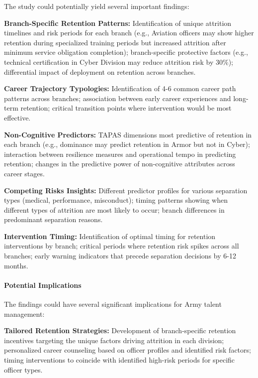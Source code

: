 \documentclass[../main.tex]{subfiles}
\begin{document}
The study could potentially yield several important findings:

\textbf{Branch-Specific Retention Patterns:} Identification of unique attrition timelines and risk periods for each branch (e.g., Aviation officers may show higher retention during specialized training periods but increased attrition after minimum service obligation completion); branch-specific protective factors (e.g., technical certification in Cyber Division may reduce attrition risk by 30\%); differential impact of deployment on retention across branches.

\textbf{Career Trajectory Typologies:} Identification of 4-6 common career path patterns across branches; association between early career experiences and long-term retention; critical transition points where intervention would be most effective.

\textbf{Non-Cognitive Predictors:} TAPAS dimensions most predictive of retention in each branch (e.g., dominance may predict retention in Armor but not in Cyber); interaction between resilience measures and operational tempo in predicting retention; changes in the predictive power of non-cognitive attributes across career stages.

\textbf{Competing Risks Insights:} Different predictor profiles for various separation types (medical, performance, misconduct); timing patterns showing when different types of attrition are most likely to occur; branch differences in predominant separation reasons.

\textbf{Intervention Timing:} Identification of optimal timing for retention interventions by branch; critical periods where retention risk spikes across all branches; early warning indicators that precede separation decisions by 6-12 months.

\paragraph{Potential Implications}

The findings could have several significant implications for Army talent management:

\textbf{Tailored Retention Strategies:} Development of branch-specific retention incentives targeting the unique factors driving attrition in each division; personalized career counseling based on officer profiles and identified risk factors; timing interventions to coincide with identified high-risk periods for specific officer types.
\end{document}
